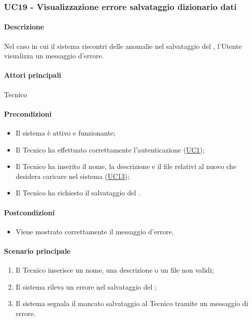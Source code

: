 \subsubsection{UC19 - Visualizzazione errore salvataggio dizionario dati}\label{UC19}
\paragraph*{Descrizione}
Nel caso in cui il sistema riscontri delle anomalie nel salvataggio del , l'Utente visualizza un messaggio d'errore.

\paragraph*{Attori principali}
Tecnico

\paragraph*{Precondizioni}
\begin{itemize}
  \item Il sistema è attivo e funzionante;
  \item Il Tecnico ha effettuato correttamente l'autenticazione (\hyperref[UC1]{UC1});
  \item Il Tecnico ha inserito il nome, la descrizione e il file relativi al nuovo  che desidera caricare nel sistema (\hyperref[UC13]{UC13});
  \item Il Tecnico ha richiesto il salvataggio del .
\end{itemize}

\paragraph*{Postcondizioni}
\begin{itemize}
  \item Viene mostrato correttamente il messaggio d'errore.
\end{itemize}

\paragraph*{Scenario principale}
\begin{enumerate}
  \item Il Tecnico inserisce un nome, una descrizione o un file non validi;
  \item Il sistema rileva un errore nel salvataggio del ;
  \item Il sistema segnala il mancato salvataggio al Tecnico tramite un messaggio di errore.  
\end{enumerate}